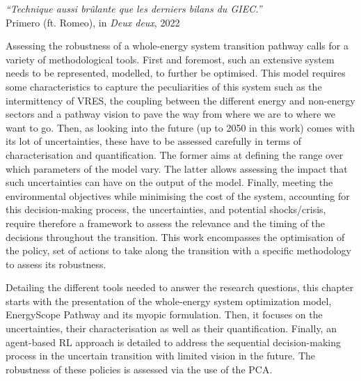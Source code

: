 \vspace{-0.2cm}
\begin{flushright}
\emph{``Technique aussi brûlante que les derniers bilans du GIEC.''}\\
 Primero (ft. Romeo), in \textit{Deux deux}, 2022
\end{flushright}
\vspace{0.4cm}
%
%
%

Assessing the robustness of a whole-energy system transition pathway calls for a variety of methodological tools. First and foremost, such an extensive system needs to be represented, \ie modelled, to further be optimised. This model requires some characteristics to capture the peculiarities of this system such as the intermittency of \gls{VRES}, the coupling between the different energy and non-energy sectors and a pathway vision to pave the way from where we are to where we want to go.  Then, as looking into the future (\ie up to 2050 in this work) comes with its lot of uncertainties, these have to be assessed carefully in terms of characterisation and quantification. The former aims at defining the range over which parameters of the model vary. The latter allows assessing the impact that such uncertainties can have on the output of the model. Finally, meeting the environmental objectives while minimising the cost of the system, accounting for this decision-making process, the uncertainties, and potential shocks/crisis, require therefore a framework to assess the relevance and the timing of the decisions throughout the transition. This work encompasses the optimisation of the policy, \ie set of actions to take along the transition with a specific methodology to assess its robustness. 

Detailing the different tools needed to answer the research questions, this chapter starts with the presentation of the whole-energy system optimization model, EnergyScope Pathway and its myopic formulation. Then, it focuses on the uncertainties, their characterisation as well as their quantification. Finally, an agent-based \acrfull{RL} approach is detailed to address the sequential decision-making process in the uncertain transition with limited vision in the future. The robustness of these policies is assessed via the use of the \gls{PCA}.

